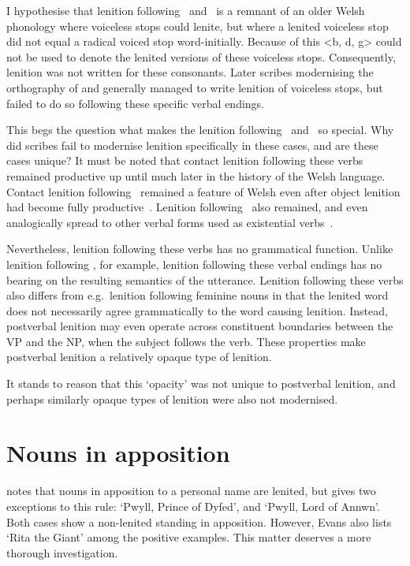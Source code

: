 I hypothesise that lenition following \ei\ and \oes\ is a remnant of an older Welsh phonology where voiceless stops could lenite, but where a lenited voiceless stop did not equal a radical voiced stop word-initially. Because of this <b, d, g> could not be used to denote the lenited versions of these voiceless stops. Consequently, lenition was not written for these consonants. Later scribes modernising the orthography of   and  generally managed to write lenition of voiceless stops, but failed to do so following these specific verbal endings.

This begs the question what makes the lenition following \ei\ and \oes\ so special. Why did scribes fail to modernise lenition specifically in these cases, and are these cases unique? It must be noted that contact lenition following these verbs remained productive up until much later in the history of the Welsh language. Contact lenition following \ei\  remained a feature of Welsh even after object lenition had become fully productive~\autocite[42]{van_sluis_development_2014}. Lenition following \oes\ also remained, and even analogically spread to other verbal forms used as existential verbs~\autocite[29, 39]{van_sluis_development_2014}.

Nevertheless, lenition following these verbs has no grammatical function. Unlike lenition following , for example, lenition following these verbal endings has no bearing on the resulting semantics of the utterance. Lenition following these verbs also differs from e.g.\ lenition following feminine nouns in that the lenited word does not necessarily agree grammatically to the word causing lenition. Instead, postverbal lenition may even operate across constituent boundaries between the VP and the NP, \eg when the subject follows the verb. These properties make postverbal lenition a relatively opaque type of lenition.

It stands to reason that this `opacity' was not unique to postverbal lenition, and perhaps similarly opaque types of lenition were also not modernised. 

\section{Nouns in apposition}
\textcite[\S19]{evans_grammar_1964} notes that nouns in apposition to a personal name are lenited, but gives two exceptions to this rule:  `Pwyll, Prince of Dyfed', and  `Pwyll, Lord of Annwn'. Both cases show a non-lenited  standing in apposition. However, Evans also lists  `Rita the Giant' among the positive examples. This matter deserves a more thorough investigation.


